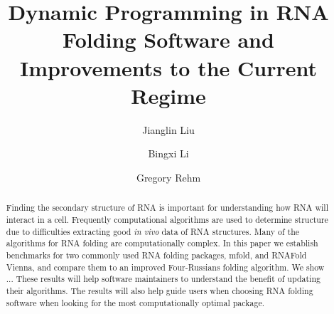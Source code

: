 \documentclass[12pt]{article}
\title{Dynamic Programming in RNA Folding Software and Improvements to the Current Regime}
\begin{document}
\author{Jianglin Liu}
\author{Bingxi Li}
\author{Gregory Rehm}
\maketitle

\begin{abstract}
Finding the secondary structure of RNA is important for understanding how RNA will interact in a cell. Frequently computational algorithms are used to determine structure due to difficulties extracting good \textit{in vivo} data of RNA structures. Many of the algorithms for RNA folding are computationally complex. In this paper we establish benchmarks for two commonly used RNA folding packages, mfold, and RNAFold Vienna, and compare them to an improved Four-Russians folding algorithm. We show ... These results will help software maintainers to understand the benefit of updating their algorithms. The results will also help guide users when choosing RNA folding software when looking for the most computationally optimal package.
\end{abstract}
\end{document}
